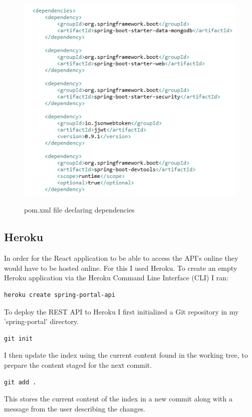 \begin{figure}[ht]
    \centering
    \includegraphics[scale=0.6]{Images/pom.png} 
    \label{pom_label}
    \caption{pom.xml file declaring dependencies}
\end{figure}

\subsection{Heroku}
In order for the React application to be able to access the API's online they would have to be hosted online. For this I used Heroku. To create an empty Heroku application via the Heroku Command Line Interface (CLI) I ran:

\begin{verbatim}
heroku create spring-portal-api
\end{verbatim}
To deploy the REST API to Heroku I first initialized a Git repository in my 'spring-portal' directory.

\begin{verbatim}
git init
\end{verbatim}
I then update the index using the current content found in the working tree, to prepare the content staged for the next commit.

\begin{verbatim}
git add .
\end{verbatim}
This stores the current content of the index in a new commit along with a message from the user describing the changes.

